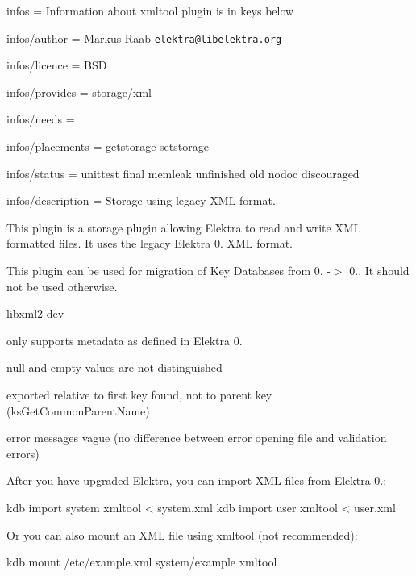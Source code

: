 
\begin{DoxyItemize}
\item infos = Information about xmltool plugin is in keys below
\item infos/author = Markus Raab \href{mailto:elektra@libelektra.org}{\tt elektra@libelektra.\+org}
\item infos/licence = B\+SD
\item infos/provides = storage/xml
\item infos/needs =
\item infos/placements = getstorage setstorage
\item infos/status = unittest final memleak unfinished old nodoc discouraged
\item infos/description = Storage using legacy X\+ML format.
\end{DoxyItemize}

This plugin is a storage plugin allowing Elektra to read and write X\+ML formatted files. It uses the legacy Elektra 0. X\+ML format.

This plugin can be used for migration of Key Databases from 0. -\/$>$ 0.. It should not be used otherwise.


\begin{DoxyItemize}
\item {\ttfamily libxml2-\/dev}
\end{DoxyItemize}


\begin{DoxyItemize}
\item only supports metadata as defined in Elektra 0.
\item null and empty values are not distinguished
\item exported relative to first key found, not to parent key (ks\+Get\+Common\+Parent\+Name)
\item error messages vague (no difference between error opening file and validation errors)
\end{DoxyItemize}

After you have upgraded Elektra, you can import X\+ML files from Elektra 0.\+:


\begin{DoxyCode}
kdb import system xmltool < system.xml
kdb import user xmltool < user.xml
\end{DoxyCode}


Or you can also mount an X\+ML file using {\ttfamily xmltool} (not recommended)\+:


\begin{DoxyCode}
kdb mount /etc/example.xml system/example xmltool
\end{DoxyCode}
 